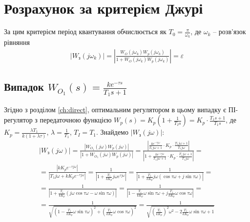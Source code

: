 \section{Розрахунок за критерієм Джурі}
За цим критерієм період квантування обчислюється як $T_0 = \frac{\pi}{\omega_k}$, де 
$\omega_k$ -- розв'язок рівняння
\begin{gather}
    \left| W_{\text{з}}(j\omega_k) \right|
    = \left|
        \frac{W_O (j \omega_k) W_p (j \omega_k)}{
            1 + W_O (j \omega_k) W_p (j \omega_k)
        }
    \right| = \varepsilon
\end{gather}

\subsection{Випадок \texorpdfstring{$W_{O_1}(s) = \frac{k e^{-\tau s}}{T_1 s + 1}$}{1}}\label{jury_for_stability}
Згідно з розділом \ref{ch:direct}, оптимальним регулятором в цьому випадку є ПІ-регулятор з передаточною функцією 
$W_p(s) = K_p \left(1 + \frac{1}{T_I s}\right) = K_p \cdot \frac{T_1 s + 1}{T_1 s}$, де $K_p = \frac{\lambda T_1}{k \left(1 + \lambda \tau\right)}$, $\lambda = \frac{1}{T_1}$, $T_I = T_1$.
Знайдемо $\left| W_{\text{з}}(j\omega) \right|$:
\begin{gather*}
    \left| W_{\text{з}}(j\omega) \right| = \frac{
        \left| W_{O_1} (j \omega) W_p (j \omega) \right|
    }{
        \left| 1 + W_{O_1} (j \omega) W_p (j \omega) \right|
    } = 
    \frac{
        \left|\frac{k e^{-\tau j \omega}}{T_1 j \omega + 1} \cdot  K_p \cdot \frac{T_1 j \omega + 1}{T_1 j \omega} \right|
    }{
        \left|1 + \frac{k e^{-\tau j \omega}}{T_1 j \omega + 1} \cdot  K_p \cdot \frac{T_1 j \omega + 1}{T_1 j \omega} \right|
    } = \\ =
    \frac{
        \left|k K_p e^{-\tau j \omega} \right|
    }{
        \left|T_1 j \omega + k K_p  e^{-\tau j \omega} \right|
    } = \frac{
        1
    }{
        \left|1 + \frac{T_1}{k K_p} j \omega e^{\tau j \omega} \right|
    } = \frac{
        1
    }{
        \left|1 + \frac{T_1}{k K_p} j \omega \left(\cos \tau\omega + j \sin \tau\omega\right) \right|
    } = \\ =
    \frac{
        1
    }{
        \left| 1 + \frac{T_1}{k K_p}
        \left(j \omega \cos \tau\omega - \omega \sin \tau\omega\right) \right|
    } = \frac{
        1
    }{
        \left| 1 - \frac{T_1}{k K_p} \omega \sin \tau\omega + 
        j \frac{T_1}{k K_p} \omega \cos \tau\omega\right|
    } = \\ = \frac{
        1
    }{
        \sqrt{
            \left(1 - \frac{T_1}{k K_p} \omega \sin \tau\omega\right)^2 +
            \left(\frac{T_1}{k K_p} \omega \cos \tau\omega\right)^2
        }
    } = \frac{
        1
    }{
        \sqrt{
            \left(\frac{T_1}{k K_p}\right)^2 \omega^2 - 2\frac{T_1}{k K_p} \omega \sin \tau\omega + 1
        }
    }
\end{gather*}
